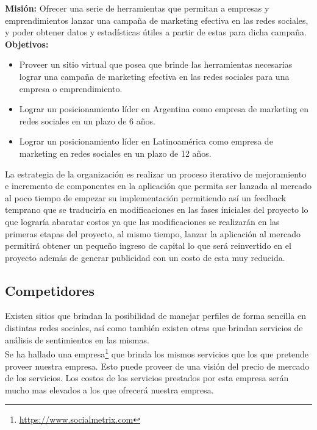 \documentclass[oneside]{book}
\begin{document}
	\textbf{Misión:} Ofrecer una serie de herramientas que permitan a empresas y emprendimientos lanzar una campa\~{n}a de marketing efectiva en las redes sociales, y poder obtener datos y estad\'{i}sticas \'{u}tiles a partir de estas para dicha campa\~{n}a.\\

	\textbf{Objetivos:}

	\begin{itemize}
		\item Proveer un sitio virtual que posea que brinde las herramientas necesarias lograr una campaña de marketing efectiva en las redes sociales para una empresa o emprendimiento.
		
		\item Lograr un posicionamiento l\'{i}der en Argentina como empresa de marketing en redes sociales en un plazo de 6 a\~{n}os.
		
		\item Lograr un posicionamiento l\'{i}der en Latinoam\'{e}rica como empresa de marketing en redes sociales en un plazo de 12 a\~{n}os.
	\end{itemize}

	La estrategia de la organizaci\'{o}n es realizar un proceso iterativo de mejoramiento e incremento de componentes en la aplicaci\'{o}n que permita ser lanzada al mercado al poco tiempo de empezar su implementaci\'{o}n permitiendo así un feedback temprano que se traducir\'{i}a en modificaciones en las fases iniciales del proyecto lo que lograr\'{i}a abaratar costos ya que las modificaciones se realizar\'{a}n en las primeras etapas del proyecto, al mismo tiempo, lanzar la aplicaci\'{o}n al mercado permitir\'{a} obtener un pequeño ingreso de capital lo que será reinvertido en el proyecto adem\'{a}s de generar publicidad con un costo de esta muy reducida.



\subsection{Competidores}
Existen sitios que brindan la posibilidad de manejar perfiles de forma sencilla en distintas redes sociales, así como también existen otras que brindan servicios de análisis de sentimientos en las mismas.\\ 
Se ha hallado una empresa\footnote{\url{https://www.socialmetrix.com}} que brinda los mismos servicios que los que pretende proveer nuestra empresa. Esto puede proveer de una visi\'{o}n del precio de mercado de los servicios. Los costos de los servicios prestados por esta empresa ser\'{a}n mucho mas elevados a los que ofrecer\'{a} nuestra empresa.
\end{document}
